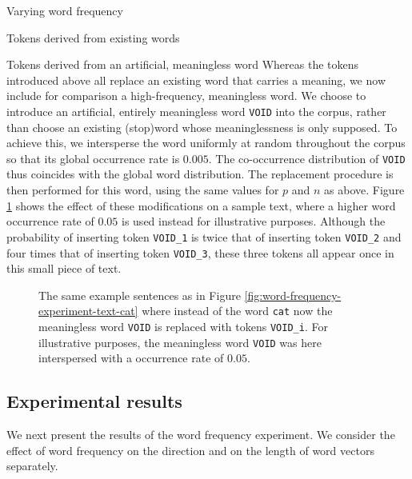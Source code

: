 \documentclass{article} %
\newcommand{\word}[1]{\texttt{#1}}
\begin{document}
\begin{section}{Varying word frequency}
\begin{subsection}{Tokens derived from existing words}
\end{subsection}

\begin{subsection}{Tokens derived from an artificial, meaningless word}\label{WFVEmeaningless}
Whereas the tokens introduced above all replace an existing word that
carries a meaning, we now include for comparison a high-frequency,
meaningless word.  We choose to introduce an artificial, entirely
meaningless word \word{VOID} into the corpus, rather than choose an
existing (stop)word whose meaninglessness is only supposed.  To achieve
this, we intersperse the word uniformly at random throughout the corpus so
that its global occurrence rate is $0.005$.  The co-occurrence
distribution of \word{VOID} thus coincides with the global word
distribution.  The replacement procedure is then performed for this
word, using the same values for $p$ and $n$ as above.
Figure \ref{fig:word-frequency-experiment-text-void} shows the effect of
these modifications on a sample text, where a higher word occurrence rate of $0.05$ is used instead
for illustrative purposes.  Although the probability of inserting token
\word{VOID\_1} is twice that of inserting token \word{VOID\_2} and four
times that of inserting token \word{VOID\_3}, these three tokens all
appear once in this small piece of text.

\begin{figure}
	\begin{mdframed}
	
	\end{mdframed}
	\caption{The same example sentences as in
          Figure \ref{fig:word-frequency-experiment-text-cat} where
          instead of the word \word{cat} now the meaningless word
          \word{VOID} is replaced with tokens \word{VOID\_i}.  For
          illustrative purposes, the meaningless word \word{VOID} was
          here interspersed with a occurrence rate of $0.05$.}
	\label{fig:word-frequency-experiment-text-void}
\end{figure}
\end{subsection}

\subsection{Experimental results}\label{WFVE-results}
We next present the results of the word frequency experiment. We
consider the effect of word frequency on the direction and on the length
of word vectors separately.


\end{section}
\end{document}
